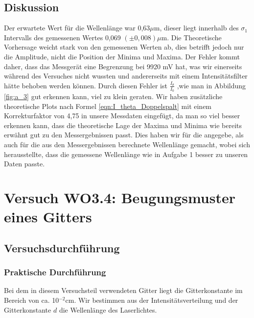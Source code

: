 \documentclass[12pt]{scrartcl}
\begin{document}
\subsection{Diskussion}
Der erwartete Wert für die Wellenlänge war 0,63$\mu$m, dieser liegt innerhalb des $\sigma_1$ Intervalls des gemessenen Wertes 0,069 $(\pm 0,008) \mu$m. Die Theoretische Vorhersage weicht stark von den gemessenen Werten ab, dies betrifft jedoch nur die Amplitude, nicht die Position der Minima und Maxima. Der Fehler kommt daher, dass das Messgerät eine Begrenzung bei 9920 mV hat, was wir einerseits während des Versuches nicht wussten und andererseits mit einem Intensitätsfilter hätte behoben werden können. Durch diesen Fehler ist $\frac{I_\theta}{I_0}$ ,wie man in Abbildung \ref{fig:a_3} gut erkennen kann, viel zu klein geraten. Wir haben zusätzliche theoretische Plots nach Formel \ref{eqn:I_theta_Doppelspalt} mit einem Korrekturfaktor von 4,75 in unsere Messdaten eingefügt, da man so viel besser erkennen kann, dass die theoretische Lage der Maxima und Minima wie bereits erwähnt gut zu den Messergebnissen passt. Dies haben wir für die angegebe, als auch für die aus den Messergebnissen berechnete Wellenlänge gemacht, wobei sich herausstellte, dass die gemessene Wellenlänge wie in Aufgabe 1 besser zu unseren Daten passte.

\section{Versuch WO3.4: Beugungsmuster eines Gitters}
\subsection{Versuchsdurchführung}

\subsubsection{Praktische Durchführung}
Bei dem in diesem Versuchsteil verwendeten Gitter liegt die Gitterkonstante im Bereich von ca. 10$^{-2}$cm. Wir bestimmen aus der Intensitätsverteilung und der Gitterkonstante $d$ die Wellenlänge des Laserlichtes.
\end{document}
